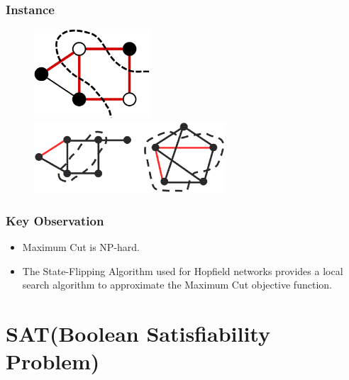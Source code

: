 \documentclass[slidestop,compress,mathserif]{beamer}
\begin{document}
\frame
{
\frametitle{Instance}
\begin{figure}
	\includegraphics[width=1.7in]{1000px-Max-cut.svg.eps}
	\\
	\includegraphics[width=2.8in]{maxcut_example_2.eps}
\end{figure}
}

\frame
{
\frametitle{Key Observation}
\begin{itemize}
	\item Maximum Cut is NP-hard.
	\item The State-Flipping Algorithm used for Hopfield networks provides a local search algorithm to approximate the Maximum Cut objective function.
\end{itemize}
}


\section{SAT(Boolean Satisfiability Problem)}
\end{document}
